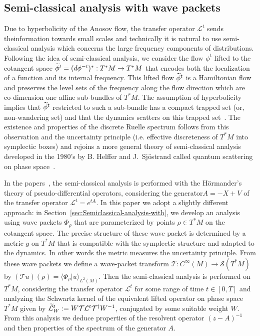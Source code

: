 \documentclass[10pt]{amsart}
\theoremstyle{definition}\newtheorem{defi}[theo]{Definition}\newtheorem{rema}[theo]{Remark}\newtheorem{exam}[theo]{Example}\newtheorem{exem}[theo]{Example}\newtheorem{nota}[theo]{Notation}
\newcommand{\clS}{\mathcal{S}}
\newcommand{\clT}{\mathcal{T}}
\newcommand{\clL}{\mathcal{L}}
\let\oldtilde\tilde
\renewcommand*{\tilde}[1]{\mathchoice{\widetilde{#1}}{\widetilde{#1}}{\oldtilde{#1}}{\oldtilde{#1}}}
\begin{document}
\subsection*{Semi-classical analysis with wave packets}

Due to hyperbolicity of the Anosov flow, the transfer operator $\clL^{t}$ sends the\linebreak information towards small scales and technically it is natural to use semi-classical analysis which concerns the large frequency components of distributions. Following the idea of semi-classical analysis, we consider the flow $\phi^{t}$ lifted to the cotangent space $\tilde{\phi}^{t}=(d\phi^{-t})^{*}:T^{*}M\rightarrow T^{*}M$ that encodes both the localization of a function and its internal frequency. This lifted flow $\tilde{\phi}^{t}$ is a Hamiltonian flow and preserves the level sets of the frequency along the flow direction which are co-dimension one affine sub-bundles of $T^{*}M$. The assumption of hyperbolicity implies that $\tilde{\phi}^{t}$ restricted to such a sub-bundle has a compact trapped set (or, non-wandering set) and that the dynamics scatters on this trapped set~\cite{fred-roy-sjostrand-07,fred_flow_09}. The existence and properties of the discrete Ruelle spectrum follows from this observation and the uncertainty principle (i.e. effective discreteness of $T^{*}M$ into symplectic boxes) and rejoins a more general theory of semi-classical analysis developed in the 1980's by B. Helffer and J.~Sj\"ostrand called quantum scattering on phase space~\cite{sjostrand_87}.

In the papers~\cite{fred-roy-sjostrand-07,fred_flow_09}, the semi-classical analysis is performed with the H\"ormander's theory of pseudo-differential operators, considering the generator\linebreak $A=-X+V$ of the transfer operator $\clL^{t}=e^{tA}$. In this paper we adopt a slightly different approach: in Section~\ref{sec:Semiclassical-analysis-with}, we develop an analysis using wave packets $\Phi_{\rho}$ that are parameterized by points $\rho\in T^{*}M$ on the cotangent space. The precise structure of these wave packet is determined by a metric $g$ on $T^{*}M$ that is compatible with the symplectic structure and adapted to the dynamics. In other words the metric measures the uncertainty principle. From these wave packets we define a wave-packet transform $\clT :C^{\infty}(M)\rightarrow\clS(T^{*}M)$ by $(\clT u)(\rho)=\langle\Phi_{\rho}|u\rangle_{L^{2}(M)}$. Then the semi-classical analysis is performed on $T^{*}M$, considering the transfer operator $\clL^{t}$ for some range of time $t\in[0,T]$ and analyzing the Schwartz kernel of the equivalent lifted operator on phase space $T^{*}M$ given by $\tilde{\clL}_{W}^{t}:=W\clT\clL^{t}\clT^{\dagger}W^{-1}$, conjugated by some suitable weight $W$. From this analysis we deduce properties of the resolvent operator $(z-A)^{-1}$ and then properties of the spectrum of the generator $A$.
\end{document}
